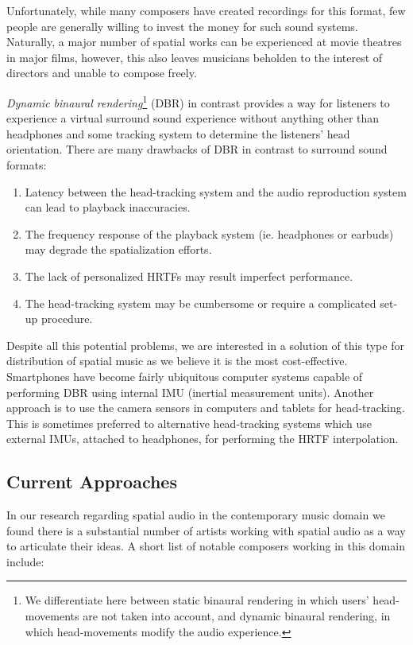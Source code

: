 Unfortunately, while many composers have created recordings for this format, few people are generally willing to invest the money for such sound systems. Naturally, a major number of spatial works can be experienced at movie theatres in major films, however, this also leaves musicians beholden to the interest of directors and unable to compose freely.

\textit{Dynamic binaural rendering}\footnote{We differentiate here between static binaural rendering in which users' head-movements are not taken into account, and dynamic binaural rendering, in which head-movements modify the audio experience.} (DBR) in contrast provides a way for listeners to experience a virtual surround sound experience without anything other than headphones and some tracking system to determine the listeners' head orientation. There are many drawbacks of DBR in contrast to surround sound formats: 

\begin{enumerate}
    \item Latency between the head-tracking system and the audio reproduction system can lead to playback inaccuracies.
    \item The frequency response of the playback system (ie. headphones or earbuds) may degrade the spatialization efforts. 
    \item The lack of personalized HRTFs may result imperfect performance. 
    \item The head-tracking system may be cumbersome or require a complicated set-up procedure.
\end{enumerate}

Despite all this potential problems, we are interested in a solution of this type for distribution of spatial music as we believe it is the most cost-effective. Smartphones have become fairly ubiquitous computer systems capable of performing DBR using internal IMU (inertial measurement units). Another approach is to use the camera sensors in computers and tablets for head-tracking. This is sometimes preferred to alternative head-tracking systems which use external IMUs, attached to headphones, for performing the HRTF interpolation. 

\subsection{Current Approaches}

In our research regarding spatial audio in the contemporary music domain we found there is a substantial number of artists working with spatial audio as a way to articulate their ideas. A short list of notable composers working in this domain include:

